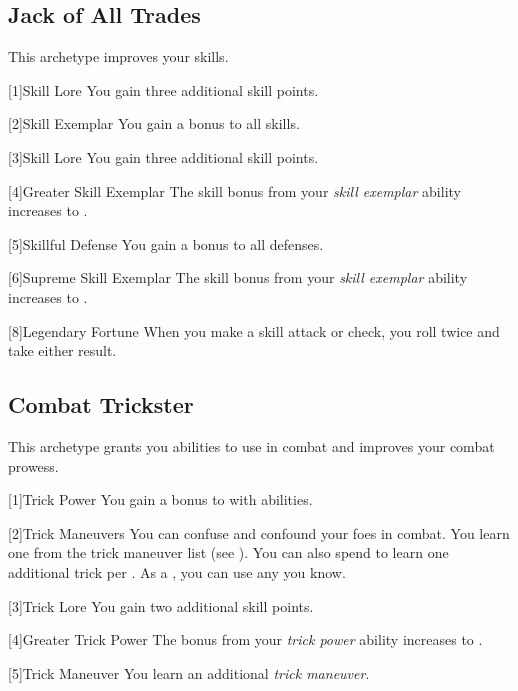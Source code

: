     \subsection{Jack of All Trades}
        This archetype improves your skills.

        [1]{Skill Lore} You gain three additional skill points.

        [2]{Skill Exemplar} You gain a  bonus to all skills.

        [3]{Skill Lore} You gain three additional skill points.

        [4]{Greater Skill Exemplar} The skill bonus from your \textit{skill exemplar} ability increases to .

        [5]{Skillful Defense} You gain a  bonus to all defenses.

        [6]{Supreme Skill Exemplar} The skill bonus from your \textit{skill exemplar} ability increases to .

        [8]{Legendary Fortune} When you make a skill attack or check, you roll twice and take either result.

    \subsection{Combat Trickster}
        This archetype grants you abilities to use in combat and improves your combat prowess.

        [1]{Trick Power} You gain a  bonus to  with  abilities.

        [2]{Trick Maneuvers}
        You can confuse and confound your foes in combat.
        You learn one  from the trick maneuver list (see ).
        You can also spend  to learn one additional trick  per .
        As a , you can use any  you know.

        [3]{Trick Lore} You gain two additional skill points.

        [4]{Greater Trick Power} The bonus from your \textit{trick power} ability increases to .

        [5]{Trick Maneuver}
        You learn an additional \textit{trick maneuver}.


